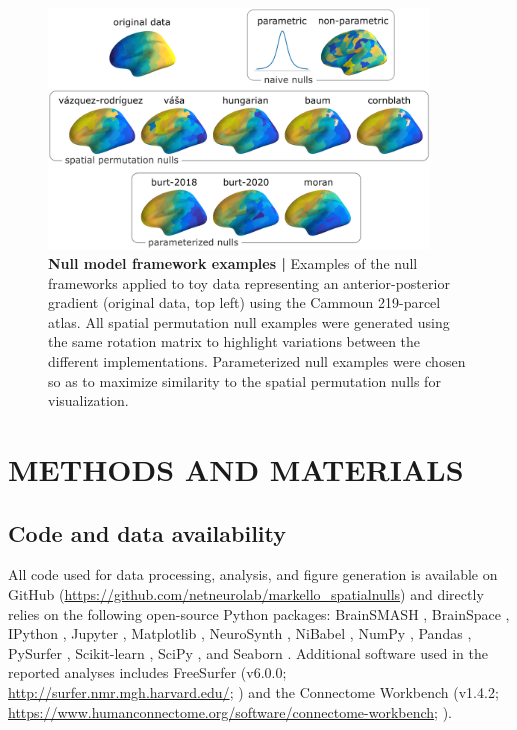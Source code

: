\documentclass[12pt,aps,pra,reprint,showkeys]{revtex4-1}
\begin{document}
\begin{figure}[htp]
  \begin{center}
    \centerline{\includegraphics[width=0.9\textwidth]{null-frameworks.png}}
    \caption{
      \textbf{Null model framework examples |}
      Examples of the null frameworks applied to toy data representing an anterior-posterior gradient (original data, top left) using the Cammoun 219-parcel atlas.
      All spatial permutation null examples were generated using the same rotation matrix to highlight variations between the different implementations.
      Parameterized null examples were chosen so as to maximize similarity to the spatial permutation nulls for visualization.
      }
    \label{figure-null-frameworks}
  \end{center}
\end{figure}

\section*{METHODS AND MATERIALS}

\subsection*{Code and data availability}

All code used for data processing, analysis, and figure generation is available on GitHub (\url{https://github.com/netneurolab/markello_spatialnulls}) and directly relies on the following open-source Python packages: BrainSMASH \citep{burt2020neuroimage}, BrainSpace \citep{vosdewael2020brainspace}, IPython \citep{ipython}, Jupyter \citep{jupyter}, Matplotlib \citep{matplotlib}, NeuroSynth \citep{yarkoni2011natmethods}, NiBabel \citep{nibabel}, NumPy \citep{numpyv1, numpyv2}, Pandas \citep{pandas}, PySurfer \citep{pysurfer}, Scikit-learn \citep{sklearn}, SciPy \citep{scipy}, and Seaborn \citep{seaborn}.
Additional software used in the reported analyses includes FreeSurfer (v6.0.0; \url{http://surfer.nmr.mgh.harvard.edu/}; \citealt{fischl1999humanbrainmap}) and the Connectome Workbench (v1.4.2; \url{https://www.humanconnectome.org/software/connectome-workbench}; \citealt{marcus2011frontiers}).
\end{document}
